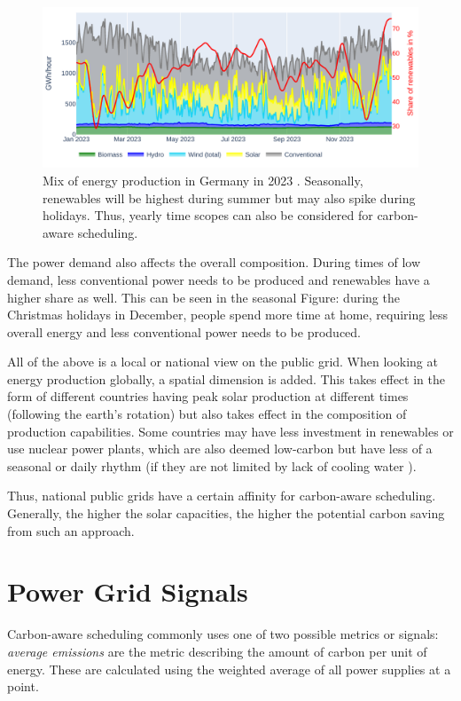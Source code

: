 \begin{figure}
    \includegraphics[width=\linewidth]{agorameter/energy_production_year.pdf}
    \caption[short]{Mix of energy production in Germany in 2023 . Seasonally, renewables will be highest during summer but may also spike during holidays. Thus, yearly time scopes can also be considered for carbon-aware scheduling.}
    \label{fig:energy_mix_year}
\end{figure}

The power demand also affects the overall composition. 
During times of low demand, less conventional power needs to be produced and renewables have a higher share as well.
This can be seen in the seasonal Figure: during the Christmas holidays in December, people spend more time at home, requiring less overall energy and less conventional power needs to be produced.

All of the above is a local or national view on the public grid. 
When looking at energy production globally, a spatial dimension is added. 
This takes effect in the form of different countries having peak solar production at different times (following the earth's rotation) but also takes effect in the composition of production capabilities.
Some countries may have less investment in renewables or use nuclear power plants, which are also deemed low-carbon but have less of a seasonal or daily rhythm (if they are not limited by lack of cooling water ).

Thus, national public grids have a certain affinity for carbon-aware scheduling\cite{wiesner_lets_2021}. Generally, the higher the solar capacities, the higher the potential carbon saving from such an approach. 

\section{Power Grid Signals}
Carbon-aware scheduling commonly uses one of two possible metrics or signals: \emph{average emissions} are the metric describing the amount of carbon per unit of energy. These are calculated using the weighted average of all power supplies at a point.

